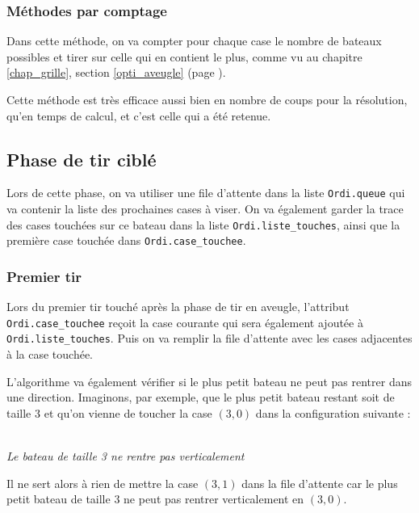 \subsubsection{Méthodes par comptage}
Dans cette méthode, on va compter pour chaque case le nombre de bateaux possibles et tirer sur celle qui en contient le plus, comme vu au chapitre \ref{chap_grille}, section \ref{opti_aveugle} (page \pageref{opti_aveugle}).

Cette méthode est très efficace aussi bien en nombre de coups pour la résolution, qu'en temps de calcul, et c'est celle qui a été retenue. 

\subsection{Phase de tir ciblé}
Lors de cette phase, on va utiliser une file d'attente dans la liste \texttt{Ordi.queue} qui va contenir la liste des prochaines cases à viser. On va également garder la trace des cases touchées sur ce bateau dans la liste \texttt{Ordi.liste\_touches}, ainsi que la première case touchée dans \texttt{Ordi.case\_touchee}.
\subsubsection{Premier tir}
Lors du premier tir touché après la phase de tir en aveugle, l'attribut \texttt{Ordi.case\_touchee} reçoit la case courante qui sera également ajoutée à \texttt{Ordi.liste\_touches}. Puis on va remplir la file d'attente avec les cases adjacentes à la case touchée.

L'algorithme va également vérifier si le plus petit bateau ne peut pas rentrer dans une direction. Imaginons, par exemple, que le plus petit bateau restant soit de taille 3 et qu'on vienne de toucher la case $(3,0)$ dans la configuration suivante :

\begin{center}
\\
\textit{Le bateau de taille 3 ne rentre pas verticalement}
\end{center}
Il ne sert alors à rien de mettre la case $(3,1)$ dans la file d'attente car le plus petit bateau de taille 3 ne peut pas rentrer verticalement en $(3,0)$.

